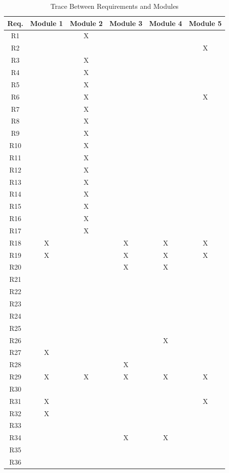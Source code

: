\documentclass[12pt, titlepage]{article}
\begin{document}
\begin{table}[H]
\centering
\begin{tabular}{| c | c | c | c | c | c |}
\toprule
\textbf{Req.} & \textbf{Module 1} & \textbf{Module 2} & \textbf{Module 3} & \textbf{Module 4} & \textbf{Module 5}\\
\hline
R1 &  & X &  &  &  \\
R2 &  &  &  &  & X \\
R3 &  & X &  &  &  \\
R4 &  & X &  &  &  \\
R5 &  & X &  &  &  \\
R6 &  & X &  &  & X \\
R7 &  & X &  &  &  \\
R8 &  & X &  &  &  \\
R9 &  & X &  &  &  \\
R10 &  & X &  &  &  \\
R11 &  & X &  &  &  \\
R12 &  & X &  &  &  \\
R13 &  & X &  &  &  \\
R14 &  & X &  &  &  \\
R15 &  & X &  &  &  \\
R16 &  & X &  &  &  \\
R17 &  & X &  &  &  \\
R18 & X &  & X & X & X \\
R19 & X &  & X & X & X \\
R20 & &  & X & X & \\
R21 &  &  &  &  &  \\
R22 &  &  &  &  &  \\
R23 &  &  &  &  &  \\
R24 &  &  &  &  &  \\
R25 &  &  &  &  &  \\
R26 &  &  &  & X &  \\
R27 & X &  &  &  &  \\
R28 &  &  & X &  &  \\
R29 & X & X & X & X & X \\
R30 &  &  &  &  &  \\
R31 & X &  &  &  & X \\
R32 & X &  &  &  &  \\
R33 &  &  &  &  &  \\
R34 &  &  & X & X &  \\
R35 &  &  &  &  &  \\
R36 &  &  &  &  &  \\
\bottomrule
\end{tabular}
\caption{Trace Between Requirements and Modules}
\label{TblRT}
\end{table}
\end{document}
